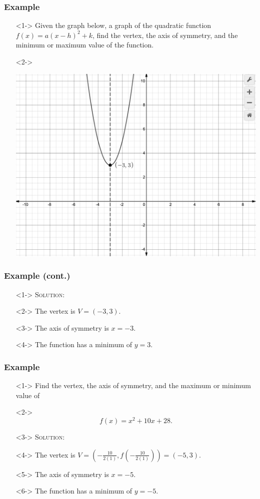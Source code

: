 \documentclass[handout]{beamer}
\begin{document}
\begin{frame}
	\frametitle{Example}
	\begin{enumerate}
		\item[]<1-> Given the graph below, a graph of the quadratic function $f(x)=a(x-h)^{2}+k$, find the vertex, the axis of symmetry, and the minimum or maximum value of the function.
		\item[]<2->
			\begin{center}
				\includegraphics[scale=0.2]{3_3_1.png}
			\end{center}
	\end{enumerate}
\end{frame}

\begin{frame}
	\frametitle{Example (cont.)}
	\begin{enumerate}
		\item[]<1-> \textsc{Solution:}
		\item[]<2-> The vertex is $V=(-3,3)$.
		\item[]<3-> The axis of symmetry is $x=-3$.
		\item[]<4-> The function has a minimum of $y=3$.
	\end{enumerate}
\end{frame}

\begin{frame}
	\frametitle{Example}
	\begin{enumerate}
		\item[]<1-> Find the vertex, the axis of symmetry, and the maximum or minimum value of
		\item[]<2->\[ f(x)=x^{2}+10x+28. \]
		\item[]<3-> \textsc{Solution:}
		\item[]<4-> The vertex is $V=\left( -\frac{10}{2(1)}, f \left( -\frac{10}{2(1)} \right)\right)=( -5,3 )$.
		\item[]<5-> The axis of symmetry is $x=-5$.
		\item[]<6-> The function has a minimum of $y=-5$.
	\end{enumerate}
\end{frame}
\end{document}
